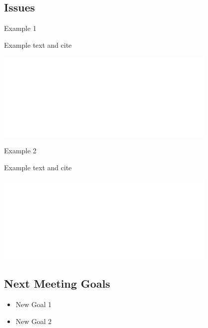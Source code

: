 \subsection{Issues}
\begin{frame}{Example 1}
	\begin{minipage}{0.5\textwidth}
		Example text and cite \cite{Bessa2017a}
	\end{minipage}%
	\colorbox{blue!20}{\begin{minipage}{0.5\textwidth}
			\includegraphics[width=0.8\textwidth]{_Example/Images/tud_white.pdf}   
	\end{minipage}}
\end{frame}

\begin{frame}{Example 2}
	\begin{minipage}{0.5\textwidth}
		Example text and cite \cite{Bessa2017a}
	\end{minipage}%
	\colorbox{red!20}{\begin{minipage}{0.5\textwidth}
			\includegraphics[width=0.8\textwidth]{_Example/Images/tud_white.pdf}   
	\end{minipage}}
\end{frame}



\subsection{Next Meeting Goals}
\begin{frame}{}
\centering
\begin{minipage}{0.6\textwidth}
		\begin{itemize}
        \centering
			\item New Goal 1
			\item New Goal 2
		\end{itemize}
	\end{minipage}
\end{frame}
